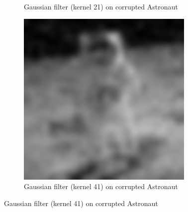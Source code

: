 \documentclass{article}
\begin{document}
\begin{figure}[H]
\begin{subfigure}{0.3\textwidth}
		\caption{Gaussian filter (kernel 21) on corrupted Astronaut}
		\label{fig:gaussian21_Astronaut}
	\end{subfigure}
	\hfill
	\begin{subfigure}{0.3\textwidth}
		\includegraphics[width=\textwidth]{Generated/Astronaut_salt_pepper_gaussian41filter.png}
		\caption{Gaussian filter (kernel 41) on corrupted Astronaut}
		\label{fig:gaussian41_Astronaut}
	\end{subfigure}


\end{figure}
\end{document}
